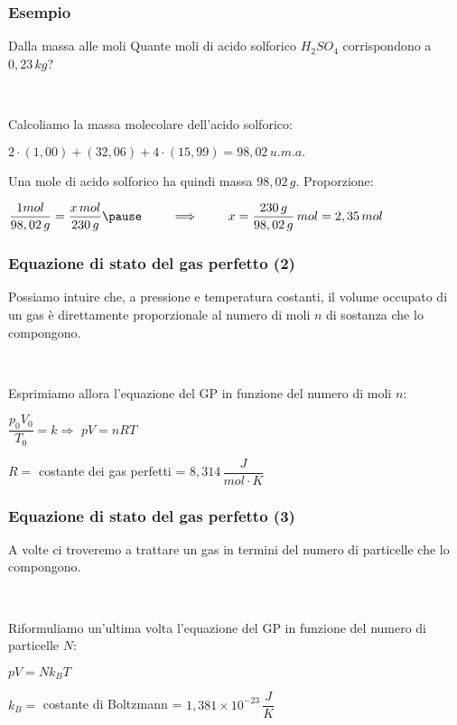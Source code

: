 \documentclass[]{beamer}
\theoremstyle{plain}
\begin{document}
\begin{frame}
\frametitle{Esempio}
\begin{exampleblock}{Dalla massa alle moli}
{\small Quante moli di acido solforico $ H_2SO_4 $ corrispondono a $ 0,23 \, kg $?}
\end{exampleblock}\pause

~

Calcoliamo la massa molecolare dell'acido solforico:
\begin{center}
$ 2 \cdot (1,00) + (32,06) + 4 \cdot (15,99) = 98,02 \, u.m.a.$
\end{center}
Una mole di acido solforico ha quindi massa $ 98,02 \, g $.{\pause} Proporzione:
\begin{center}
$ \dfrac{1 mol}{98,02 \, g} = \dfrac{x \, mol}{230 \, g} \pause ~~~~~~~ \Longrightarrow ~~~~~~~ x = \dfrac{230\, g}{98,02 \, g} \, mol = 2,35 \, mol $
\end{center}
\end{frame}

\begin{frame}
\frametitle{Equazione di stato del gas perfetto (2)}
Possiamo intuire che, a pressione e temperatura costanti, \alert<1>{il volume occupato di un gas è direttamente proporzionale al numero di moli} $ n $ di sostanza che lo compongono.\pause

~

Esprimiamo allora l'equazione del GP in funzione del numero di moli $ n $:
\begin{center}
$ \dfrac{p_0 V_0}{T_0} = k \Longrightarrow $ \colorbox{blue!30}{$ pV = nRT $}
\end{center}
$ R = $ costante dei gas perfetti = $ 8,314 \, \dfrac{J}{mol \cdot K} $
\end{frame}



\begin{frame}
\frametitle{Equazione di stato del gas perfetto (3)}
A volte ci troveremo a trattare un gas in termini del numero di particelle che lo compongono.\pause

~

Riformuliamo un'ultima volta l'equazione del GP in funzione del numero di particelle $ N $:
\begin{center}
\colorbox{blue!30}{$ pV = Nk_B T $}
\end{center}
$ k_B = $ costante di Boltzmann = $ 1,381 \times 10^{-23} \, \dfrac{J}{K} $
\end{frame}
\end{document}
